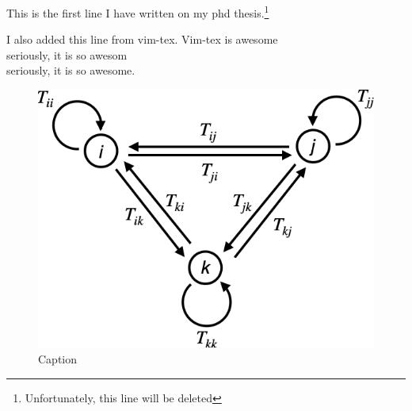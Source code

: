 This is the first line I have written on my phd thesis.\footnote{Unfortunately, this line will be deleted}

I also added this line from vim-tex. Vim-tex is awesome \\

seriously, it is so awesom \\

seriously, it is so awesome.
\vfill

\newpage
\begin{figure}
    \centering
    \includegraphics[scale=0.5]{figures/graph.png}
    \caption{Caption}
    \label{fig:my_label}
\end{figure}
